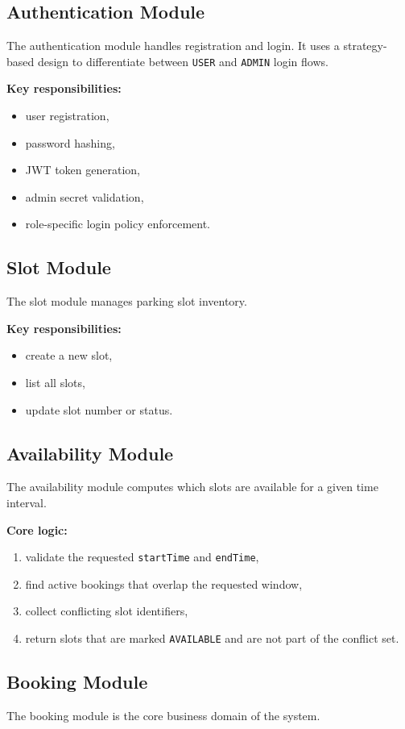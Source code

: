 \documentclass[12pt,a4paper]{article}
\begin{document}
\subsection{Authentication Module}
The authentication module handles registration and login. It uses a strategy-based design to differentiate between \texttt{USER} and \texttt{ADMIN} login flows.

\textbf{Key responsibilities:}
\begin{itemize}
    \item user registration,
    \item password hashing,
    \item JWT token generation,
    \item admin secret validation,
    \item role-specific login policy enforcement.
\end{itemize}

\subsection{Slot Module}
The slot module manages parking slot inventory.

\textbf{Key responsibilities:}
\begin{itemize}
    \item create a new slot,
    \item list all slots,
    \item update slot number or status.
\end{itemize}

\subsection{Availability Module}
The availability module computes which slots are available for a given time interval.

\textbf{Core logic:}
\begin{enumerate}
    \item validate the requested \texttt{startTime} and \texttt{endTime},
    \item find active bookings that overlap the requested window,
    \item collect conflicting slot identifiers,
    \item return slots that are marked \texttt{AVAILABLE} and are not part of the conflict set.
\end{enumerate}

\subsection{Booking Module}
The booking module is the core business domain of the system.
\end{document}
